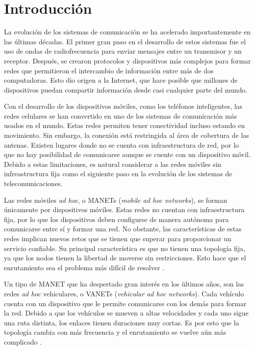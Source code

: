 ﻿\chapter{Introducción}
\label{ch:introduccion}

La evolución de los sistemas de comunicación se ha acelerado importantemente en
las últimas décadas. El primer gran paso en el desarrollo de estos sistemas fue
el uso de ondas de radiofrecuencia para enviar mensajes entre un transmisor y
un receptor. Después, se crearon protocolos y dispositivos más complejos para
formar redes que permitieron el intercambio de información entre más de dos
computadoras. Esto dio origen a la Internet, que hace posible que millones de
dispositivos puedan compartir información desde casi cualquier parte del mundo.

Con el desarrollo de los dispositivos móviles, como los teléfonos inteligentes,
las redes celulares se han convertido en uno de los sistemas de comunicación
más usados en el mundo. Estas redes permiten tener conectividad incluso estando
en movimiento. Sin embargo, la conexión está restringida al área de cobertura de
las antenas. Existen lugares donde no se cuenta con infraestructura de red, por
lo que no hay posibilidad de comunicarse aunque se cuente con un dispositivo
móvil. Debido a estas limitaciones, es natural considerar a las redes móviles
sin infreastructura fija como el siguiente paso en la evolución de los sistemas
de telecomunicaciones.

Las redes móviles \textit{ad hoc}, o MANETs (\textit{mobile ad hoc networks}),
se forman únicamente por dispositivos móviles. Estas redes no cuentan con
infraestructura fija, por lo que los dispositivos deben configurse de manera
autónoma para comunicarse entre sí y formar una red. No obstante, las
características de estas redes implican nuevos retos que se tienen que superar
para proporcionar un servicio confiable. Su principal característica es que no
tienen una topología fija, ya que los nodos tienen la libertad de moverse sin
restricciones. Esto hace que el enrutamiento sea el problema más difícil de
resolver \cite{Li2008}.

Un tipo de MANET que ha despertado gran interés en los últimos años, son las
redes \textit{ad hoc} vehiculares, o VANETs (\textit{vehicular ad hoc
networks}). Cada vehículo cuenta con un dispositivo que le permite comunicarse
con los demás para formar la red. Debido a que los vehículos se mueven a altas
velocidades y cada uno sigue una ruta distinta, los enlaces tienen duraciones
muy cortas. Es por esto que la topología cambia con más frecuencia y el
enrutamiento se vuelve aún más complicado \cite{Meneguette2018}.


